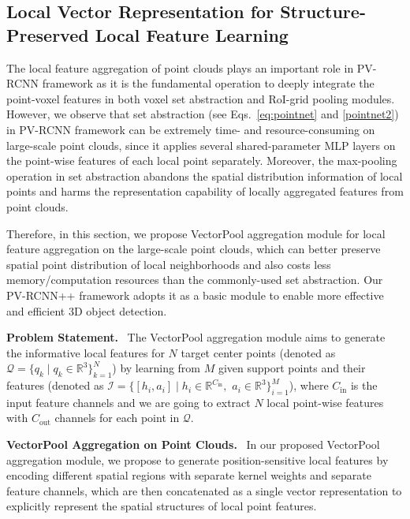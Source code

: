\documentclass[natbib,twocolumn]{svjour3}          \smartqed  \usepackage{graphicx}
\begin{document}
\subsection{Local Vector Representation for Structure-Preserved Local Feature Learning}
\label{sec:vectorpool}
The local feature aggregation of point clouds plays an important role in PV-RCNN framework as it is the fundamental operation to deeply integrate the point-voxel features in both voxel set abstraction and RoI-grid pooling modules. 
However, we observe that set abstraction (see Eqs.~\eqref{eq:pointnet} and \eqref{pointnet2}) in PV-RCNN framework 
can be extremely time- and resource-consuming on large-scale point clouds, since it applies several shared-parameter MLP layers on the point-wise features of each local point separately. 
Moreover, the max-pooling operation in set abstraction abandons the spatial distribution information of local points and harms the representation capability of locally aggregated features from point clouds.


Therefore, in this section, we propose VectorPool aggregation module for local feature aggregation on the large-scale point clouds, 
which can better preserve spatial point distribution of local neighborhoods and also costs less memory/computation resources than the commonly-used set abstraction. 
Our PV-RCNN++ framework adopts it as a basic module to enable more effective and efficient 3D object detection.

\noindent
\textbf{Problem Statement.}~
The VectorPool aggregation module aims to generate the informative local features for $N$ target center points (denoted as $\mathcal{Q}=\{q_k \mid q_k \in \mathbb{R}^3\}_{k=1}^{N}$) by learning from $M$ given support points and their features (denoted as $\mathcal{I}=\{[h_i, a_i] \mid h_i \in \mathbb{R}^{C_{\text{in}}},$ $a_i \in \mathbb{R}^3\}_{i=1}^M$), where $C_{\text{in}}$  is the input feature channels and we are going to extract $N$ local point-wise features with $C_{\text{out}}$ channels for each point in $\mathcal{Q}$.



\noindent
\textbf{VectorPool Aggregation on Point Clouds.}~
In our proposed VectorPool aggregation module, we propose to generate position-sensitive local features by encoding different spatial regions  with separate kernel weights and separate feature channels, which are then concatenated as a single vector representation to explicitly represent the spatial structures of local point features. 
\end{document}
